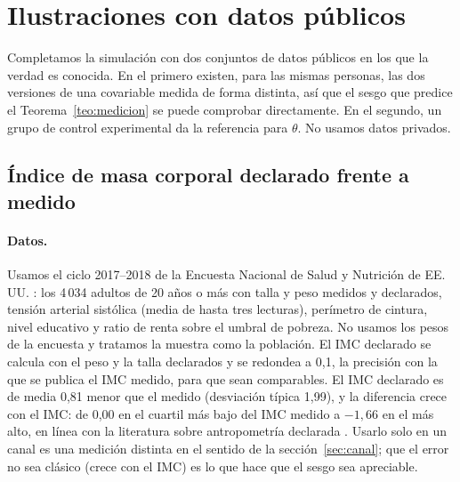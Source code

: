 \section{Ilustraciones con datos públicos}\label{sec:ilustraciones}

Completamos la simulación con dos conjuntos de datos públicos en los que la verdad es conocida. En el primero existen, para las mismas personas, las dos versiones de una covariable medida de forma distinta, así que el sesgo que predice el Teorema~\ref{teo:medicion} se puede comprobar directamente. En el segundo, un grupo de control experimental da la referencia para $\theta$. No usamos datos privados.

\subsection{Índice de masa corporal declarado frente a medido}\label{sec:nhanes}

\paragraph{Datos.} Usamos el ciclo 2017--2018 de la Encuesta Nacional de Salud y Nutrición de EE.\,UU. \citep{nchs2020}: los 4\,034 adultos de 20 años o más con talla y peso medidos y declarados, tensión arterial sistólica (media de hasta tres lecturas), perímetro de cintura, nivel educativo y ratio de renta sobre el umbral de pobreza. No usamos los pesos de la encuesta y tratamos la muestra como la población. El IMC declarado se calcula con el peso y la talla declarados y se redondea a 0,1, la precisión con la que se publica el IMC medido, para que sean comparables. El IMC declarado es de media 0,81 menor que el medido (desviación típica 1,99), y la diferencia crece con el IMC: de 0,00 en el cuartil más bajo del IMC medido a $-1,66$ en el más alto, en línea con la literatura sobre antropometría declarada \citep{connorgorber2007}. Usarlo solo en un canal es una medición distinta en el sentido de la sección~\ref{sec:canal}; que el error no sea clásico (crece con el IMC) es lo que hace que el sesgo sea apreciable.

